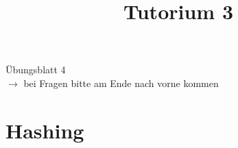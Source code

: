 
\title[Algorithmen I SS 14]{Tutorium 3}

\usepackage{alltt}






\begin{frame}
  \maketitle
\end{frame}

\begin{frame}
	\Huge
	\begin{center}
		Übungsblatt 4
		\ \\
		\normalsize
		$\rightarrow $ bei Fragen bitte am Ende nach vorne kommen
	\end{center}
\end{frame}
\section{Hashing}

